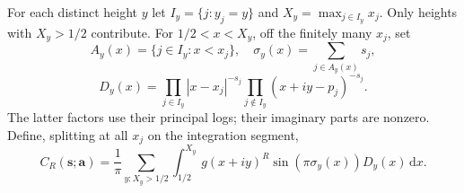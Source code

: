 \documentclass[11pt,letterpaper]{article}
\theoremstyle{definition}\newtheorem{definition}[theorem]{Definition}
\theoremstyle{remark}\newtheorem{remark}[theorem]{Remark}
\newcommand{\dd}{\,\mathrm d}\newcommand{\M}{\mathcal M}
\begin{document}
For each distinct height $y$ let $I_y=\{j:y_j=y\}$ and
$X_y=\max_{j\in I_y}x_j$. Only heights with $X_y>1/2$ contribute.
For $1/2<x<X_y$, off the finitely many $x_j$, set
\begin{equation}\label{mr:eq:active}
 A_y(x)=\{j\in I_y:x<x_j\},\quad
 \sigma_y(x)=\sum_{j\in A_y(x)}s_j,
\end{equation}
\begin{equation}\label{mr:eq:D}
 D_y(x)=\prod_{j\in I_y}|x-x_j|^{-s_j}
         \prod_{j\notin I_y}(x+iy-p_j)^{-s_j}.
\end{equation}
The latter factors use their principal logs; their imaginary parts are
nonzero. Define, splitting at all $x_j$ on the integration segment,
\begin{equation}\label{mr:eq:C}
 C_R(\boldsymbol s;\boldsymbol a)=\frac1\pi
 \sum_{y:X_y>1/2}\int_{1/2}^{X_y}
 g(x+iy)^R\sin(\pi\sigma_y(x))D_y(x)\dd x.
\end{equation}
\end{document}
